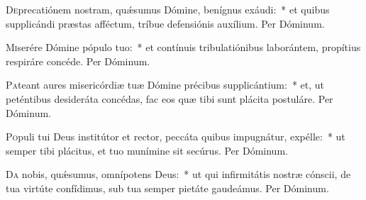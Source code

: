 \documentclass[vesperale_romanum.tex]{subfiles}
\begin{document}




\oratio

\lettrine{D}{e}precatiónem nostram, quǽsumus Dómine, benígnus exáudi:~* et quibus supplicándi præstas afféctum, tríbue defensiónis auxílium. Per Dóminum.



\oratio

\lettrine{M}{i}serére Dómine pópulo tuo:~* et contínuis tribulatiónibus laborántem, propítius respiráre concéde. Per Dóminum.



\oratio

\lettrine{P}{a}teant aures misericórdiæ tuæ Dómine précibus supplicántium:~* et, ut peténtibus desideráta concédas, fac eos quæ tibi sunt plácita postuláre.
Per Dóminum.



\oratio

\lettrine{P}{o}puli tui Deus institútor et rector, peccáta quibus impugnátur, expélle:~* ut semper tibi plácitus, et tuo munímine sit secúrus. Per Dóminum.



\oratio

\lettrine{D}{a}  nobis, quǽsumus, omnípotens Deus:~* ut qui infirmitátis nostræ cónscii, de tua virtúte confídimus, sub tua semper pietáte gaudeámus.
Per Dóminum.
\end{document}
